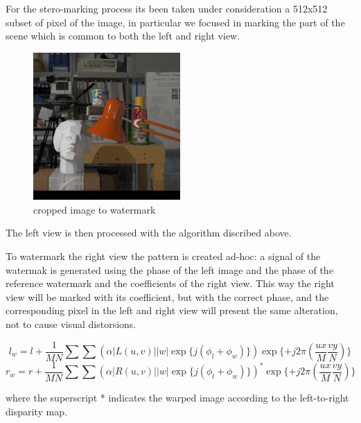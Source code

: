 For the stero-marking process its been taken under consideration a 512x512 subset of pixel of the image, in particular we focused in marking the part of the scene which is common to both the left and right view.

\begin{figure}[h!]
\centering
\includegraphics[width=0.5\textwidth]{./img/squared.png}
\caption{\small{cropped image to watermark}}
\label{fig:cropped}
\end{figure}

The left view is then processed with the algorithm discribed above.\newline 

To watermark the right view the pattern is created ad-hoc: a signal of the watermak is generated using the phase of the left image and the phase of the reference watermark and  the coefficients of the right view.\newline  
This way the right view will be marked with its coefficient, but with the correct phase, and the corresponding pixel in the left and right view will present the same alteration, not to cause visual distorsions.

$$ l_{w} = l + \frac{1}{MN}\sum\sum(\alpha|L(u,v)||w|\exp\{j(\phi_{l}+\phi_{w})\})\exp\{+j2\pi(\frac{ux}{M}\frac{vy}{N})\} $$
$$ r_{w} = r + \frac{1}{MN}\sum\sum(\alpha|R(u,v)||w|\exp\{j(\phi_{l}+\phi_{w})\})^{*}\exp\{+j2\pi(\frac{ux}{M}\frac{vy}{N})\} $$

where the superscript * indicates the warped image according to the left-to-right disparity map.

